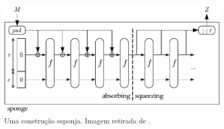 \documentclass{article}
\begin{document}
\begin{itemize}
\begin{enumerate}[label=\roman*.]
\end{enumerate}

\begin{figure}[H]
    \centering
    \includegraphics[scale=0.9]{sponge}
    \caption{Uma construção esponja. Imagem retirada de \cite{SpongeReference}.}
    \label{fig:sponge}
\end{figure}


\end{itemize}
\end{document}
